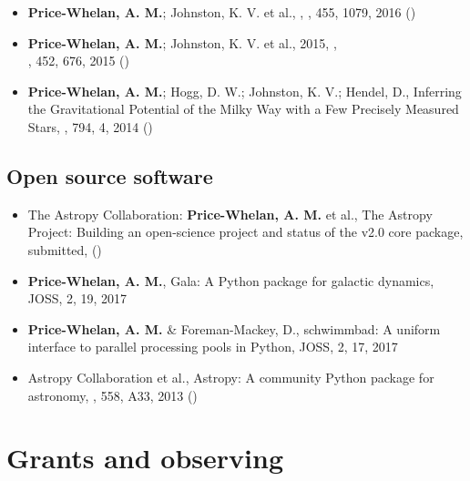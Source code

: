 \documentclass[12pt,letterpaper]{article}
\begin{document}
\begin{itemize}
\item {\bf Price-Whelan, A. M.}; Johnston, K. V. et al.,
    ,
    \mnras, 455, 1079, 2016 ()

\item {\bf Price-Whelan, A. M.}; Johnston, K. V. et al., 2015,
    ,\\
    \mnras, 452, 676, 2015 ()

\item {\bf Price-Whelan, A. M.}; Hogg, D. W.; Johnston, K. V.; Hendel, D.,
    {Inferring the Gravitational Potential of the Milky Way with a Few Precisely Measured Stars},
    \apj, 794, 4, 2014 ()

    \end{itemize}

    \subsection*{Open source software}
    \begin{itemize}

\item The Astropy Collaboration: {\bf Price-Whelan, A. M.} et al.,
    {The Astropy Project: Building an open-science project and status of the v2.0 core package},
    \apj submitted, ()

\item {\bf Price-Whelan, A. M.},
    {Gala: A Python package for galactic dynamics},
    JOSS, 2, 19, 2017

\item {\bf Price-Whelan, A. M.} \& Foreman-Mackey, D.,
    {schwimmbad: A uniform interface to parallel processing pools in Python},
    JOSS, 2, 17, 2017

\item Astropy Collaboration et al.,
    {Astropy: A community Python package for astronomy},
    \aanda, 558, A33, 2013 ()

	\end{itemize}

\section*{Grants and observing }
\end{document}
